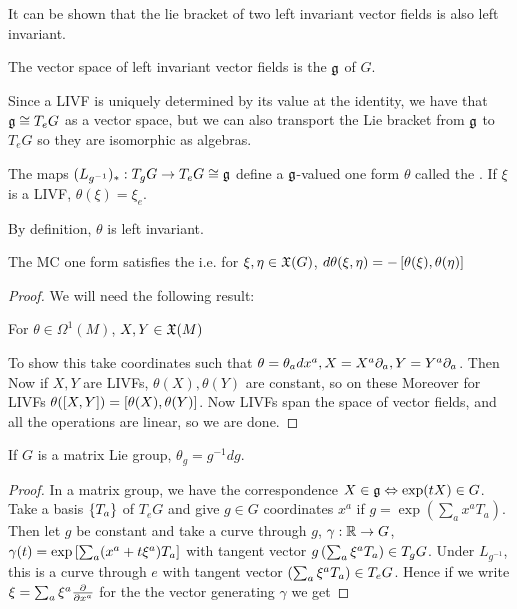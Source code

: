 \documentclass{article}
\begin{document}
It can be shown that the lie bracket of two left invariant vector fields is also left invariant. 
\begin{definition}
The vector space of left invariant vector fields is the  $\mf{g}$ of $G$. 
\end{definition}
Since a LIVF is uniquely determined by its value at the identity, we have that $\mf{g} \cong T_e G$ as a vector space, but we can also transport the Lie bracket from $\mf{g}$ to $T_e G$ so they are isomorphic as algebras. 
\begin{definition}
The maps $(L_{g^{-1}})_\ast : T_g G \to T_e G \cong \mf{g}$ define a $\mf{g}$-valued one form $\theta$ called the . If $\xi$ is a LIVF, $\theta(\xi) = \xi_e$. 
\end{definition}
By definition, $\theta$ is left invariant. 
\begin{theorem}
The MC one form satisfies the  
i.e. for $\xi,\eta \in \mf{X}(G)$, $d\theta(\xi,\eta) = -\comm[\theta(\xi)]{\theta(\eta)}$
\end{theorem}
\begin{proof}
We will need the following result:
\begin{claim}
For $\theta \in \Omega^1(M)$, $X,Y \in \mf{X}(M)$
\end{claim}
To show this take coordinates such that $\theta = \theta_a dx^a, X = X^a \del_a, Y=Y^a \del_a$. Then 
Now if $X,Y$ are LIVFs, $\theta(X), \theta(Y)$ are constant, so on these 
Moreover for LIVFs $\theta(\comm[X]{Y}) = \comm[\theta(X)]{\theta(Y)}$. Now LIVFs span the space of vector fields, and all the operations are linear, so we are done. 
\end{proof}

\begin{prop}
If $G$ is a matrix Lie group, $\theta_g = g^{-1}dg$. 
\end{prop}
\begin{proof}
In a matrix group, we have the correspondence $X \in \mf{g} \Leftrightarrow \exp(tX) \in G$. Take a basis $\pbrace{T_a}$ of $T_eG$ and give $g\in G$ coordinates $x^a$ if $g = \exp(\sum_a x^a T_a)$. Then let $g$ be constant and take a curve through $g$, $\gamma:\mbb{R}\to G$, $\gamma(t) = \exp\psquare{\sum_a (x^a + t\xi^a)T_a}$ with tangent vector $g\pround{\sum_a \xi^a T_a} \in T_gG$. Under $L_{g^{-1}}$, this is a curve through $e$ with tangent vector $\pround{\sum_a \xi^a T_a} \in T_eG$. Hence if we write $\xi = \sum_a \xi^a \pd{x^a}$ for the the vector generating $\gamma$ we get 
\end{proof}
\end{document}
